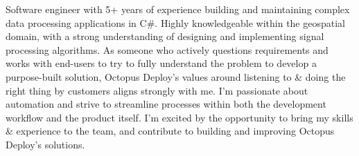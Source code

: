 \begin{justify}
Software engineer with 5+ years of experience building and maintaining complex data processing applications in C\#. Highly knowledgeable within the geospatial domain, with a strong understanding of designing and implementing signal processing algorithms. As someone who actively questions requirements and works with end-users to try to fully understand the problem to develop a purpose-built solution, Octopus Deploy's values around listening to \& doing the right thing by customers aligns strongly with me. I'm passionate about automation and strive to streamline processes within both the development workflow and the product itself. I'm excited by the opportunity to bring my skills \& experience to the team, and contribute to building and improving Octopus Deploy's solutions.
\end{justify}